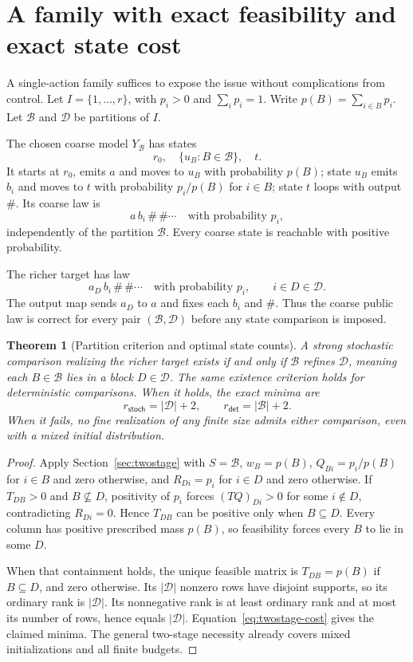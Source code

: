 \documentclass[11pt]{article}
\newtheorem{theorem}{Theorem}[section]
\newcommand{\Bcal}{\mathcal{B}}
\newcommand{\Dcal}{\mathcal{D}}
\begin{document}
\section{A family with exact feasibility and exact state cost}
\label{sec:partition}

A single-action family suffices to expose the issue without complications from control. Let $I=\{1,\ldots,r\}$, with $p_i>0$ and $\sum_i p_i=1$. Write $p(B)=\sum_{i\in B}p_i$. Let $\Bcal$ and $\Dcal$ be partitions of $I$.

The chosen coarse model $Y_{\Bcal}$ has states
\[
 r_0,\quad \{u_B:B\in\Bcal\},\quad t.
\]
It starts at $r_0$, emits $a$ and moves to $u_B$ with probability $p(B)$; state $u_B$ emits $b_i$ and moves to $t$ with probability $p_i/p(B)$ for $i\in B$; state $t$ loops with output $\#$. Its coarse law is
\[
 a\,b_i\,\#\,\#\cdots \quad\text{with probability }p_i,
\]
independently of the partition $\Bcal$. Every coarse state is reachable with positive probability.

The richer target has law
\[
 a_D\,b_i\,\#\,\#\cdots \quad\text{with probability }p_i,
 \qquad i\in D\in\Dcal.
\]
The output map sends $a_D$ to $a$ and fixes each $b_i$ and $\#$. Thus the coarse public law is correct for every pair $(\Bcal,\Dcal)$ before any state comparison is imposed.

\begin{theorem}[Partition criterion and optimal state counts]
\label{thm:partition}
A strong stochastic comparison realizing the richer target exists if and only if $\Bcal$ refines $\Dcal$, meaning each $B\in\Bcal$ lies in a block $D\in\Dcal$. The same existence criterion holds for deterministic comparisons. When it holds, the exact minima are
\[
 r_{\mathsf{stoch}}=|\Dcal|+2,
 \qquad r_{\mathsf{det}}=|\Bcal|+2.
\]
When it fails, no fine realization of any finite size admits either comparison, even with a mixed initial distribution.
\end{theorem}

\begin{proof}
Apply Section~\ref{sec:twostage} with $S=\Bcal$, $w_B=p(B)$, $Q_{Bi}=p_i/p(B)$ for $i\in B$ and zero otherwise, and $R_{Di}=p_i$ for $i\in D$ and zero otherwise. If $T_{DB}>0$ and $B\nsubseteq D$, positivity of $p_i$ forces $(TQ)_{Di}>0$ for some $i\notin D$, contradicting $R_{Di}=0$. Hence $T_{DB}$ can be positive only when $B\subseteq D$. Every column has positive prescribed mass $p(B)$, so feasibility forces every $B$ to lie in some $D$.

When that containment holds, the unique feasible matrix is $T_{DB}=p(B)$ if $B\subseteq D$, and zero otherwise. Its $|\Dcal|$ nonzero rows have disjoint supports, so its ordinary rank is $|\Dcal|$. Its nonnegative rank is at least ordinary rank and at most its number of rows, hence equals $|\Dcal|$. Equation~\eqref{eq:twostage-cost} gives the claimed minima. The general two-stage necessity already covers mixed initializations and all finite budgets.
\end{proof}
\end{document}
